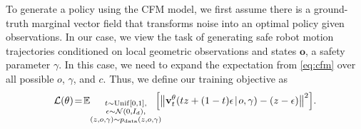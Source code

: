 \documentclass[letterpaper, 10 pt, conference]{ieeeconf}
\begin{document}
To generate a policy using the CFM model, we first assume there is a ground-truth marginal vector field that transforms noise into an optimal policy given observations. In our case, we view the task of generating safe robot motion trajectories conditioned on local geometric observations and states $\mathbf{o}$, a safety parameter $\gamma$. In this case, we need to expand the expectation from \eqref{eq:cfm} over all possible $o$, $\gamma$, and $c$. Thus, we define our training objective as
\begin{equation}
\mathcal{L}(\theta)\!=\!
\mathbb{E}_{\substack{
t\sim \mathrm{Unif}[0,1],\\ \epsilon\sim\mathcal{N}(0,I_d),\\
(z,o,\gamma)\sim p_{\mathrm{data}}(z,o,\gamma)
}}
\!\!\!\!\Bigl[\bigl\|\mathbf{v}_t^\theta(tz+(1-t)\epsilon\!\mid\! o,\gamma)-(z-\epsilon)\bigr\|^2\Bigr].
\label{eq:cfm_cost}
\end{equation}


\end{document}
